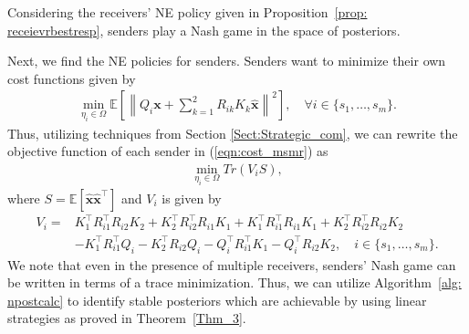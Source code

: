 \documentclass[12pt,journal,onecolumn]{IEEEtran}
\newtheorem{lemma}{Lemma}
\begin{document}

Considering the receivers' NE policy given in Proposition~\ref{prop: receievrbestresp}, senders play a Nash game in the space of posteriors. 

Next, we find the NE policies for senders. %
Senders want to minimize their own cost functions given by    
\begin{align}  \label{eqn:cost_msmr}  \min_{\eta_i\in\Omega}\mathbb{E}\left[\left\|Q_i\boldsymbol{x}+\sum_{k=1}^2 R_{ik}K_k\hat{\boldsymbol{x}}\right\|^2\right], \quad\forall i\in \{s_1,\dots, s_m\}.
\end{align}
Thus, utilizing techniques from Section \ref{Sect:Strategic_com}, %
we can rewrite the objective function of each sender in (\ref{eqn:cost_msmr}) as
\begin{align}\label{eqn_senders_obj}
    \min_{\eta_i\in\Omega} Tr(V_iS),
\end{align}
where $S=\mathbb{E}[\hat{\boldsymbol{x}}\hat{\boldsymbol{x}}^\top]$ and $V_i$ is given by 
\begin{align}
    V_{i}=&K_1^\top R_{i 1}^\top R_{i2}K_2+K_2^\top R_{i2}^\top R_{i1}K_1+K_1^\top R_{i1}^\top R_{i1}K_1+K_2^\top R_{i2}^\top R_{i2}K_2\nonumber\\
    &-K_1^\top R_{i1}^\top Q_{i}-K_2^\top R_{i2}Q_{i}-Q_{i}^\top R_{i1}^\top K_1-Q_{i}^\top R_{i2}K_2, \quad i\in \{s_1,\dots, s_m\}.
\end{align}
We note that even in the presence of multiple receivers, senders' Nash game can be written in terms of a trace minimization. Thus, we can utilize Algorithm~\ref{alg: npostcalc} to identify stable posteriors which are achievable by using linear strategies as proved in Theorem~\ref{Thm_3}.   
\end{document}
